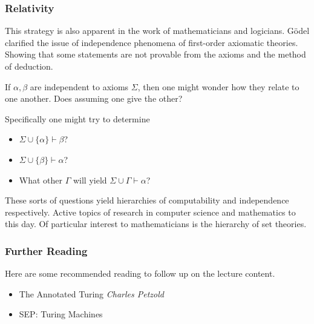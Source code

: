 \documentclass{beamer}
\begin{document}
\begin{frame}
	\frametitle{Relativity}

	This strategy is also apparent in the work of mathematicians and logicians. G\"{o}del clarified the issue of independence phenomena of first-order axiomatic theories. Showing that some statements are not provable from the axioms and the method of deduction.

	\vspace{0.5cm}

	If $\alpha, \beta$ are independent to axioms $\Sigma$, then one might wonder how they relate to one another. Does assuming one give the other? 
	
	\vspace{0.5cm}

	Specifically one might try to determine 

		\begin{itemize}
			\item[] $\Sigma \cup \{\alpha\} \vdash \beta$?
			\item[] $\Sigma \cup \{\beta\} \vdash \alpha$?
			\item[] What other $\Gamma$ will yield $\Sigma \cup \Gamma \vdash \alpha$?
		\end{itemize}
	
	These sorts of questions yield hierarchies of computability and independence respectively. Active topics of research in computer science and mathematics to this day. Of particular interest to mathematicians is the hierarchy of set theories. 
	
\end{frame}

\begin{frame}
	\frametitle{Further Reading}
	
	Here are some recommended reading to follow up on the lecture content.
	
	\vspace{0.5cm}
	
	\begin{itemize}
		\item The Annotated Turing \emph{Charles Petzold}
		\item SEP: Turing Machines
	\end{itemize}
	
\end{frame}
\end{document}

